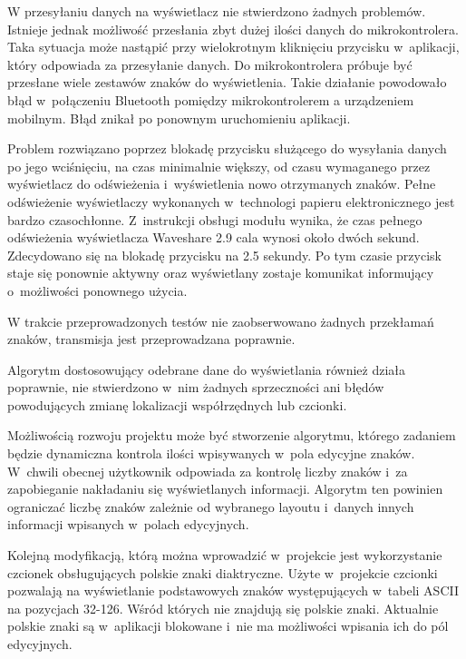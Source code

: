 \documentclass[a4paper,12pt, twoside]{article}
\begin{document}
    	W przesyłaniu danych na wyświetlacz nie stwierdzono żadnych problemów. Istnieje jednak możliwość przesłania zbyt dużej ilości danych do mikrokontrolera. Taka sytuacja może nastąpić przy wielokrotnym kliknięciu przycisku w~aplikacji, który odpowiada za przesyłanie danych. Do mikrokontrolera próbuje być przesłane wiele zestawów znaków do wyświetlenia. Takie działanie powodowało błąd w~połączeniu Bluetooth pomiędzy mikrokontrolerem a urządzeniem mobilnym. Błąd znikał po ponownym uruchomieniu aplikacji.
    	
    	Problem rozwiązano poprzez blokadę przycisku służącego do wysyłania danych po jego wciśnięciu, na czas minimalnie większy, od czasu wymaganego przez wyświetlacz do odświeżenia i~wyświetlenia nowo otrzymanych znaków. Pełne odświeżenie wyświetlaczy wykonanych w~technologi papieru elektronicznego jest bardzo czasochłonne. Z~instrukcji obsługi modułu wynika, że czas pełnego odświeżenia wyświetlacza Waveshare 2.9 cala wynosi około dwóch sekund\cite{waveshare}. Zdecydowano się na blokadę przycisku na 2.5 sekundy. Po tym czasie przycisk staje się ponownie aktywny oraz wyświetlany zostaje komunikat informujący o~możliwości ponownego użycia. 
    	
    	W trakcie przeprowadzonych testów nie zaobserwowano żadnych przekłamań znaków, transmisja jest przeprowadzana poprawnie. 
    	
    	Algorytm dostosowujący odebrane dane do wyświetlania również działa poprawnie, nie stwierdzono w~nim żadnych sprzeczności ani błędów powodujących zmianę lokalizacji współrzędnych lub czcionki.
    	
    	Możliwością rozwoju projektu może być stworzenie algorytmu, którego zadaniem będzie dynamiczna kontrola ilości wpisywanych w~pola edycyjne znaków. W~chwili obecnej użytkownik odpowiada za kontrolę liczby znaków i~za zapobieganie nakładaniu się wyświetlanych informacji. Algorytm ten powinien ograniczać liczbę znaków zależnie od wybranego layoutu i~danych innych informacji wpisanych w~polach edycyjnych.

        Kolejną modyfikacją, którą można wprowadzić w~projekcie jest wykorzystanie czcionek obsługujących polskie znaki diaktryczne. Użyte w~projekcie czcionki pozwalają na wyświetlanie podstawowych znaków występujących w~tabeli ASCII na pozycjach 32-126. Wśród których nie znajdują się polskie znaki. Aktualnie polskie znaki są w~aplikacji blokowane i~nie ma możliwości wpisania ich do pól edycyjnych.
        
\end{document}

